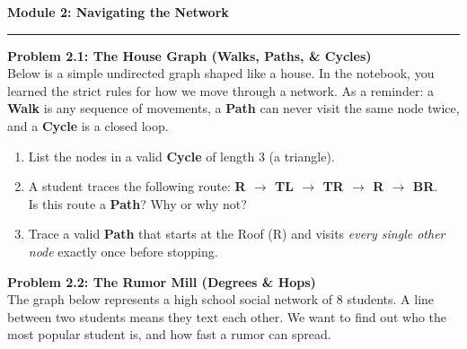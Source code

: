\documentclass[12pt, a4paper]{article}
\newcommand{\moduleheader}[1]{
    \vspace{1cm}
    {\Large \textcolor{riseblue}{\textbf{#1}}}
    \vspace{0.3cm}
    \hrule
    \vspace{0.5cm}
}
\begin{document}
\moduleheader{Module 2: Navigating the Network}

\textbf{Problem 2.1: The House Graph (Walks, Paths, \& Cycles)} \\
Below is a simple undirected graph shaped like a house. In the notebook, you learned the strict rules for how we move through a network. As a reminder: a \textbf{Walk} is any sequence of movements, a \textbf{Path} can never visit the same node twice, and a \textbf{Cycle} is a closed loop.

\begin{center}
\end{center}

\begin{enumerate}
    \item List the nodes in a valid \textbf{Cycle} of length 3 (a triangle).
    \item A student traces the following route: \textbf{R $\rightarrow$ TL $\rightarrow$ TR $\rightarrow$ R $\rightarrow$ BR}. \\
    Is this route a \textbf{Path}? Why or why not?
    \item Trace a valid \textbf{Path} that starts at the Roof (R) and visits \textit{every single other node} exactly once before stopping.
\end{enumerate}

\vspace{0.8cm}

\textbf{Problem 2.2: The Rumor Mill (Degrees \& Hops)} \\
The graph below represents a high school social network of 8 students. A line between two students means they text each other. We want to find out who the most popular student is, and how fast a rumor can spread.
\end{document}
